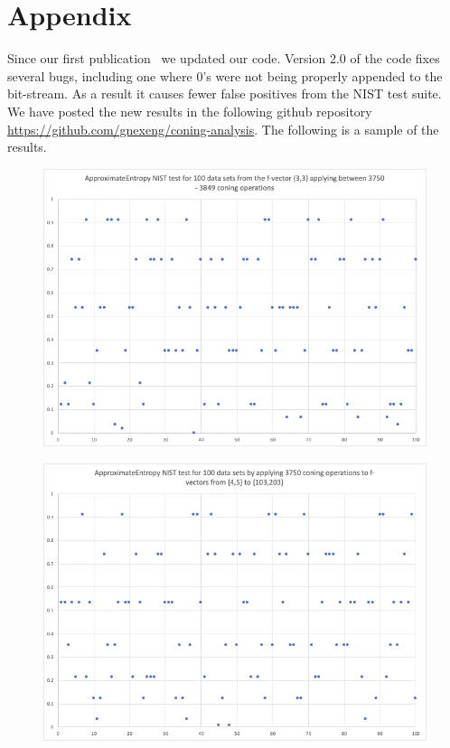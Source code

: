 \documentclass[oneside,12pt]{amsart}
\theoremstyle{definition}
\numberwithin{equation}{section}
\begin{document}
\section{Appendix} \label{appendix}


Since our first publication~\cite{ALDH} we updated our code. Version 2.0 of the code fixes several bugs, including one where 0's were not being properly appended to the bit-stream. As a result it causes fewer false positives from the NIST test suite. We have posted the new results in the following github repository \url{https://github.com/gnexeng/coning-analysis}. The following is a sample of the results. 

\begin{figure}[h!]
\centering
\includegraphics[scale=.5]{./charts/ApproximateEntropy_3_3.png}
\label{fig:approxentropy33}
\end{figure}

\begin{figure}[h!]
\centering
\includegraphics[scale=.5]{./charts/ApproximateEntropy_4_5.png}
\label{fig:approxentropy45}
\end{figure}
\end{document}
